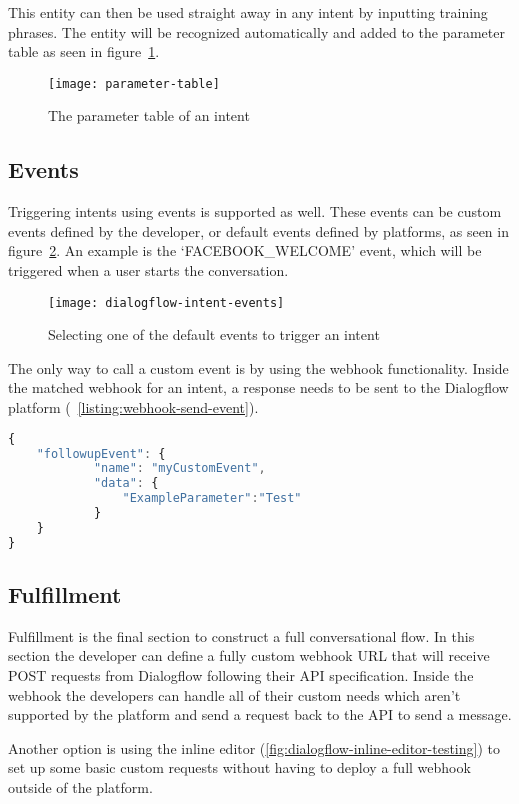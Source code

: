 This entity can then be used straight away in any intent by inputting training phrases. The entity will be recognized automatically and added to the parameter table as seen in figure~\ref{fig:parameter-table}.

\begin{figure}[ht]
	\centering
	\texttt{[image: parameter-table]}
	\caption{The parameter table of an intent}
	\label{fig:parameter-table}
\end{figure}

\subsection{Events}

Triggering intents using events is supported as well. These events can be custom events defined by the developer, or default events defined by platforms, as seen in figure~\ref{fig:dialogflow-intent-events}. An example is the `FACEBOOK\_WELCOME' event, which will be triggered when a user starts the conversation.

\begin{figure}[ht]
	\centering
	\texttt{[image: dialogflow-intent-events]}
	\caption{Selecting one of the default events to trigger an intent}
	\label{fig:dialogflow-intent-events}
\end{figure}

\newpage

The only way to call a custom event is by using the webhook functionality. Inside the matched webhook for an intent, a response needs to be sent to the Dialogflow platform (~\ref{listing:webhook-send-event}).

\begin{lstlisting}[language=JavaScript,caption={The response that needs to be sent to the Dialogflow API to trigger a custom event},label=listing:webhook-send-event]
{
	"followupEvent": {
			"name": "myCustomEvent",
			"data": {
				"ExampleParameter":"Test"
			}
	}
}
\end{lstlisting}

\subsection{Fulfillment}

Fulfillment is the final section to construct a full conversational flow. In this section the developer can define a fully custom webhook URL that will receive POST requests from Dialogflow following their API specification. Inside the webhook the developers can handle all of their custom needs which aren't supported by the platform and send a request back to the API to send a message.

Another option is using the inline editor (\ref{fig:dialogflow-inline-editor-testing}) to set up some basic custom requests without having to deploy a full webhook outside of the platform.